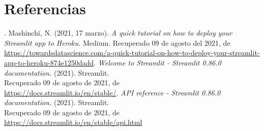 \documentclass{article}
\begin{document}
\section{Referencias}
. Mashinchi, N. (2021, 17 marzo). \textit{A quick tutorial on how to deploy your Streamlit app to Heroku.} Medium.
Recuperado 09 de agosto del 2021, de \\ \url{https://towardsdatascience.com/a-quick-tutorial-on-how-to-deploy-your-streamlit-app-to-heroku-874e1250dadd}\newline {}. \textit{Welcome to Streamlit - Streamlit 0.86.0 documentation.} (2021). Streamlit. \\ Recuperado 09 de agosto de 2021, de \\
\url{https://docs.streamlit.io/en/stable/}\newline {}. \textit{API reference - Streamlit 0.86.0 documentation.} (2021). Streamlit. \\ Recuperado 09 de agosto de 2021, de \\
\url{https://docs.streamlit.io/en/stable/api.html}
\end{document}
